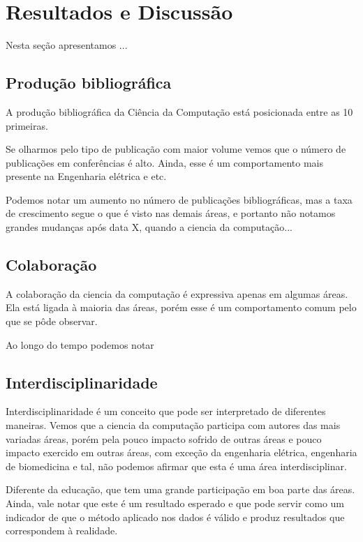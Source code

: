 \chapter{Resultados e Discussão}
Nesta seção apresentamos ...

\section{Produção bibliográfica}

A produção bibliográfica da Ciência da Computação está posicionada entre as 10 primeiras.

Se olharmos pelo tipo de publicação com maior volume vemos que o número de publicações em conferências é alto. Ainda, esse é um comportamento mais presente na Engenharia elétrica e etc.

Podemos notar um aumento no número de publicações bibliográficas, mas a taxa de crescimento segue o que é visto nas demais áreas, e portanto não notamos grandes mudanças após data X, quando a ciencia da computação...

\section{Colaboração}

A colaboração da ciencia da computação é expressiva apenas em algumas áreas. Ela está ligada à maioria das áreas, porém esse é um comportamento comum pelo que se pôde observar.

Ao longo do tempo podemos notar

\section{Interdisciplinaridade}

Interdisciplinaridade é um conceito que pode ser interpretado de diferentes maneiras. Vemos que a ciencia da computação participa com autores das mais variadas áreas, porém pela pouco impacto sofrido de outras áreas e pouco impacto exercido em outras áreas, com exceção da engenharia elétrica, engenharia de biomedicina e tal, não podemos afirmar que esta é uma área interdisciplinar.

Diferente da educação, que tem uma grande participação em boa parte das áreas. Ainda, vale notar que este é um resultado esperado e que pode servir como um indicador de que o método aplicado nos dados é válido e produz resultados que correspondem à realidade.

